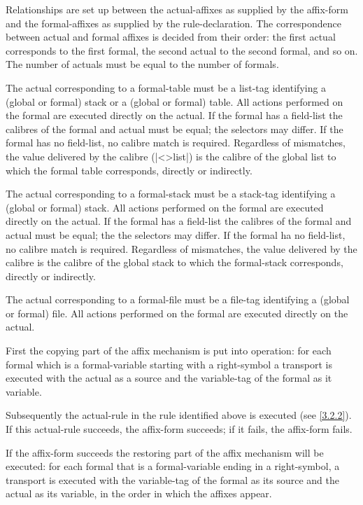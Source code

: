 \documentclass{article}
\newcommand\g[1]{{\sf #1}}
\let\oref\ref
\let\ref\oref
\begin{document}
\smallskip
Relationships are set up between the \g{actual-affix}es as supplied by the
\g{affix-form} and the \g{formal-affix}es as supplied by the \g{rule-declaration}.
The correspondence between actual and formal affixes is decided
from their order: the first actual corresponds to the first formal, the
second actual to the second formal, and so on. The number of actuals must be
equal to the number of formals.

The \g{actual} corresponding to a \g{formal-table} must be a \g{list-tag}
identifying a (global or formal) stack or a (global or formal) table. All actions
performed on the \g{formal} are executed directly on the \g{actual}. If the
\g{formal} has a \g{field-list} the calibres
of the \g{formal} and
\g{actual} must be equal; the selectors may differ. If the \g{formal}
has no \g{field-list}, no calibre
match is required. Regardless of
mismatches, the value delivered by the \g{calibre} (\pp|<>list|) is the
calibre of the global list to which the \g{formal table}
corresponds, directly or indirectly.

The \g{actual} corresponding to a \g{formal-stack} must be a \g{stack-tag}
identifying
a (global or formal) stack. All actions performed on the \g{formal} are
executed directly on the \g{actual}. If the \g{formal} has a \g{field-list}
the calibres of the
\g{formal} and \g{actual} must be equal; the
the selectors may differ. If the \g{formal} ha no \g{field-list}, no
calibre match is required. Regardless of mismatches, the value delivered by the
\g{calibre} is the calibre of the global stack to which the
\g{formal-stack} corresponds, directly or indirectly.

The \g{actual} corresponding to a \g{formal-file} must be a \g{file-tag}
identifying
a (global or formal) file. All actions performed on the \g{formal} are
executed directly on the \g{actual}.

\smallskip

First the copying part of the affix mechanism is put into operation: for
each \g{formal} which is a \g{formal-variable} starting with a 
\g{right-symbol} a \g{transport} is executed with the \g{actual} as a \g{source} and
the \g{variable-tag} of the \g{formal} as it \g{variable}.

Subsequently the \g{actual-rule} in the rule identified above is executed
(see \ref{3.2.2}). If this \g{actual-rule} succeeds, the \g{affix-form}
succeeds; if it fails, the \g{affix-form} fails.

If the \g{affix-form} succeeds the restoring part of the affix mechanism
will be executed: for each \g{formal} that is a \g{formal-variable} ending
in a \g{right-symbol}, a \g{transport} is executed with the \g{variable-tag}
of the \g{formal} as its
\g{source} and the \g{actual} as its \g{variable}, in the order in which
the affixes appear.
\end{document}
